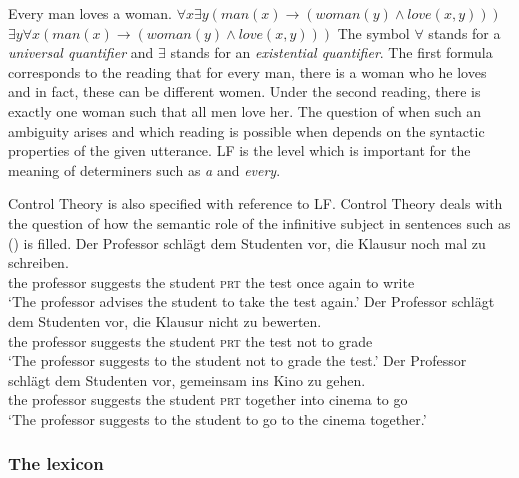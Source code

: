 \eal
\label{Beispiel-Every-man-loves-a-woman}
\ex Every man loves a woman.
\ex $\forall x \exists y (man(x) \to (woman(y) \wedge love(x,y)))$
\ex $\exists y \forall x (man(x) \to (woman(y) \wedge love(x,y)))$
\zl
The symbol $\forall$\is{$\forall$} stands for a \emph{universal quantifier} and $\exists$\is{$\exists$} stands for an
\emph{existential quantifier}. The first formula corresponds to the reading that for every man, there is a woman who he loves
and in fact, these can be different women. Under the second reading, there is exactly one woman such that all men love her. The question of when such an
ambiguity arises and which reading is possible when depends on the syntactic properties of the given utterance. LF is the level which is important for the
meaning of determiners such as \emph{a} and \emph{every}.

Control Theory is also specified with reference to LF. Control Theory deals with the question of how the semantic role of the infinitive
subject in sentences such as () is filled.
\eal
\ex 
\gll Der Professor schlägt dem Studenten vor, die Klausur noch mal zu schreiben.\\
	 the professor suggests the student \textsc{prt} the test once again to write\\
\glt `The professor advises the student to take the test again.'
\ex 
\gll Der Professor schlägt dem Studenten vor, die Klausur nicht zu bewerten.\\
	 the professor suggests the student \textsc{prt} the test not to grade\\
\glt `The professor suggests to the student not to grade the test.'
\ex 
\gll Der Professor schlägt dem Studenten vor, gemeinsam ins Kino zu gehen.\\
	 the professor suggests the student \textsc{prt} together into cinema to go\\
\glt `The professor suggests to the student to go to the cinema together.'
\zl
{}

\subsubsection{The lexicon}
\label{Abschnitt-GB-Lexikon}

